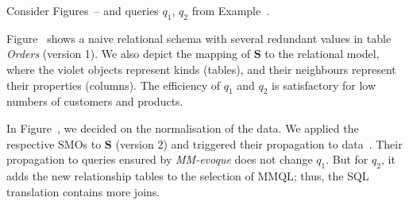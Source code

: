 \begin{example}
Consider Figures~-- and queries $q_1$, $q_2$ from Example~.

Figure~ shows a naive relational schema with several redundant values in table \textit{Orders} (version 1). We also depict the mapping of $\mathbf{S}$ to the relational model, where the violet objects represent kinds (tables), and their neighbours represent their properties (columns). The efficiency of $q_1$ and $q_2$ is satisfactory for low numbers of customers and products.




In Figure~, we decided on the normalisation of the data. We applied the respective SMOs to $\mathbf{S}$ (version 2) and triggered their propagation to data~\citep{cikm_2022}. Their propagation to queries ensured by \textit{MM-evoque} does not change $q_1$. But for $q_2$, it adds the new relationship tables to the selection of MMQL; thus, the SQL translation contains more joins.




\end{example}
